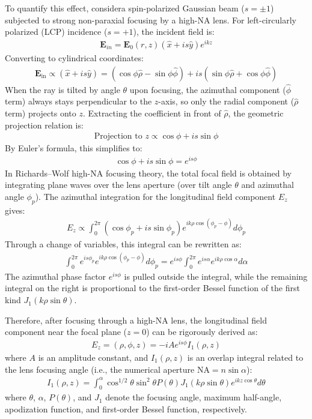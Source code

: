 To quantify this effect, considera spin-polarized Gaussian beam ($s = \pm 1$) subjected to strong non-paraxial focusing by a high-NA lens. For left-circularly polarized (LCP) incidence ($s = +1$), the incident field is:
\begin{align}
\mathbf{E}_{in} = \mathbf{E}_{0} (r,z) (\hat{x} + is\hat{y})e^{ikz}
\end{align}
Converting to cylindrical coordinates:
\begin{align}
\mathbf{E}_{\text{in}} \propto (\hat{x} + is\hat{y}) = (\cos\phi \hat{\rho} - \sin\phi \hat{\phi}) + is(\sin\phi \hat{\rho} + \cos\phi \hat{\phi})
\end{align}
When the ray is tilted by angle $\theta$ upon focusing, the azimuthal component ($\hat{\phi}$ term) always stays perpendicular to the $z$-axis, so only the radial component ($\hat{\rho}$ term) projects onto $z$. Extracting the coefficient in front of $\hat{\rho}$, the geometric projection relation is:
\begin{align}
\text{Projection to } z \propto \cos\phi + is\sin\phi
\end{align}
By Euler's formula, this simplifies to:
\begin{align}
\cos\phi + is\sin\phi = e^{is\phi}
\end{align}
In Richards--Wolf high-NA focusing theory, the total focal field is obtained by integrating plane waves over the lens aperture (over tilt angle $\theta$ and azimuthal angle $\phi_p$). The azimuthal integration for the longitudinal field component $E_z$ gives:
\begin{align}
E_z \propto \int_0^{2\pi} (\cos\phi_p + is\sin\phi_p) e^{ik\rho\cos(\phi_p - \phi)} d\phi_p
\end{align}
Through a change of variables, this integral can be rewritten as:
\begin{align}
\int_0^{2\pi} e^{is\phi_p} e^{ik\rho\cos(\phi_p - \phi)} d\phi_p = e^{is\phi} \int_0^{2\pi} e^{is\alpha} e^{ik\rho\cos\alpha} d\alpha
\end{align}
The azimuthal phase factor $e^{is\phi}$ is pulled outside the integral, while the remaining integral on the right is proportional to the first-order Bessel function of the first kind $J_1(k\rho\sin\theta)$.

Therefore, after focusing through a high-NA lens, the longitudinal field component near the focal plane ($z=0$) can be rigorously derived as:
\begin{align}
E_{z}= (\rho, \phi, z) = -iAe^{is\phi}I_{1}(\rho,z)
\end{align}
where $A$ is an amplitude constant, and $I_1(\rho, z)$ is an overlap integral related to the lens focusing angle (i.e., the numerical aperture $\text{NA} = n\sin\alpha$):
\begin{align}
I_1(\rho, z) = \int_0^\alpha \cos^{1/2}\theta \sin^2\theta P(\theta) J_1(k\rho\sin\theta) e^{ikz\cos\theta} d\theta
\end{align}
where $\theta$, $\alpha$, $P(\theta)$, and $J_1$ denote the focusing angle, maximum half-angle, apodization function, and first-order Bessel function, respectively.

